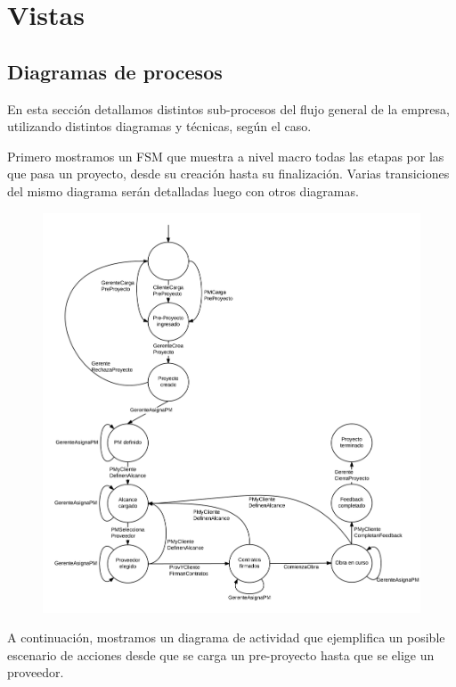\section{Vistas}




	\subsection{Diagramas de procesos}

En esta sección detallamos distintos sub-procesos del flujo general de la empresa, 
utilizando distintos diagramas y técnicas, según el caso. 

Primero mostramos un FSM que muestra a nivel macro todas las etapas por las 
que pasa un proyecto, desde su creación hasta su finalización. Varias transiciones 
del mismo diagrama serán detalladas luego con otros diagramas. 

\begin{figure}[H]
\includegraphics[width=\linewidth]{diag/nuevos/fsm-proj.png}
\label{fsm-proj}
\end{figure}

A continuación, mostramos un diagrama de actividad que ejemplifica un posible 
escenario de acciones desde que se carga un pre-proyecto hasta que se elige un 
proveedor. 

